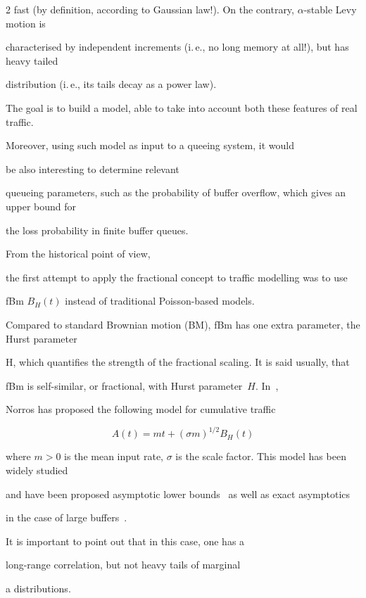 \begin{multicols}{2}
fast (by definition, according to Gaussian law!). On the contrary,  $\alpha$-stable Levy motion is 

characterised by independent increments (i.\,e., no long memory at all!), but has heavy tailed 

distribution (i.\,e., its tails decay as a power law). 



The goal is to build a model, able to take into account both these features of real traffic. 

Moreover, using such model as input to a queeing system, it would 

be also interesting to determine relevant 

queueing parameters, such as the probability of buffer overflow, which gives an upper bound for 

the loss probability in finite buffer queues. 



From the historical point of view, 

the first attempt to apply the fractional concept to traffic modelling was to use 

fBm $B_H (t)$ instead of traditional Poisson-based models. 

Compared to standard Brownian motion (BM), fBm has one extra parameter, the Hurst parameter 

H, which quantifies the strength of the fractional scaling. It is said usually, that 

fBm is self-similar, or fractional, with Hurst parameter~$H$. In~\cite{10-nik},

Norros has proposed the following model for cumulative traffic 

$$

A(t) = m t + (\sigma m)^{1/2} B_H (t) 

$$

where $m>0$ is the mean input rate, $\sigma$ is the scale factor. This model has been widely studied 

and have been proposed asymptotic lower bounds~\cite{10-nik} as well as exact asymptotics 

in the case of large buffers~\cite{11-nik, 12-nik}.



It is important to point out that in this case, one has a

long-range correlation, but not heavy tails of marginal 

a distributions.




\end{multicols}
